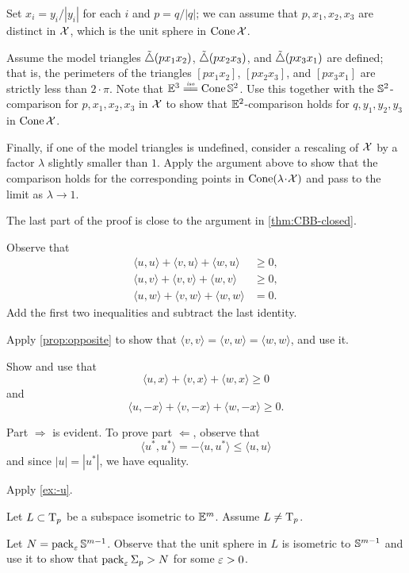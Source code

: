 Set $x_i=y_i/|y_i|$ for each $i$ and $p=q/|q|$; we can assume that $p,x_1,x_2,x_3$ are distinct in $\mathcal{X}$, which is the unit sphere in $\mathop{\rm Cone}\nolimits\mathcal{X}$.

Assume the model triangles $\tilde\triangle(px_1x_2)$, $\tilde\triangle(px_2x_3)$, and $\tilde\triangle(px_3x_1)$ are defined;
that is, the perimeters of the triangles $[px_1x_2]$, $[px_2x_3]$, and $[px_3x_1]$ are strictly less than $2\cdot\pi$.
Note that $\EE^3\iso\Cone\SSS^2$.
Use this together with the $\mathbb{S}^2$-comparison for $p,x_1,x_2,x_3$ in $\mathcal{X}$ to show that $\mathbb{E}^2$-comparison holds for $q,y_1,y_2,y_3$ in $\mathop{\rm Cone}\nolimits\mathcal{X}$.

Finally, if one of the model triangles is undefined, consider a rescaling of $\mathcal{X}$ by a factor $\lambda$ slightly smaller than $1$.
Apply the argument above to show that the comparison holds for the corresponding points in $\Cone(\lambda\cdot\spc{X})$ and pass to the limit as $\lambda\to 1$.

The last part of the proof is close to the argument in \ref{thm:CBB-closed}.

Observe that
\begin{align*}
\langle u,u\rangle+\langle v,u\rangle+\langle w,u\rangle &\ge 0,
\\
\langle u,v\rangle+\langle v,v\rangle+\langle w,v\rangle &\ge 0,
\\
\langle u,w\rangle+\langle v,w\rangle+\langle w,w\rangle &= 0.
\end{align*}
Add the first two inequalities and subtract the last identity.

Apply \ref{prop:opposite} to show that 
$\langle v,v\rangle =\langle v,w\rangle=\langle w,w\rangle$,
and use it.

 Show and use that
\[\langle u,x\rangle +\langle v,x\rangle +\langle w,x\rangle \ge 0\]
and
\[\langle u,-x\rangle +\langle v,-x\rangle +\langle w,-x\rangle \ge 0.\]

 Part $\Rightarrow$ is evident.
To prove part $\Leftarrow$, observe that 
\[\langle u^*,u^*\rangle =-\langle u,u^*\rangle\le \langle u,u\rangle\]
and since $|u|=|u^*|$, we have equality.

Apply \ref{ex:-u}.

Let $L\subset \mathrm{T}_p$ be a subspace isometric to $\mathbb{E}^m$.
Assume $L\ne \mathrm{T}_p$.

Let $N=\operatorname{\rm pack}\nolimits_\varepsilon\mathbb{S}^{m-1}$.
Observe that the unit sphere in $L$ is isometric to $\mathbb{S}^{m-1}$ and
use it to show that $\operatorname{\rm pack}\nolimits_\varepsilon\Sigma_p>N$ for some $\varepsilon>0$.

